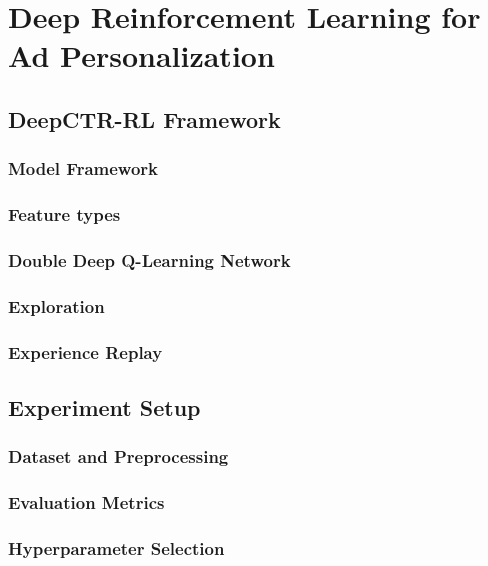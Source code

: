 \documentclass{mldsmsc}
\begin{document}
\chapter{Deep Reinforcement Learning for Ad Personalization}
\label{chap:deep-rl-for-ad-personalization}

\section{DeepCTR-RL Framework}

\subsection{Model Framework}

\subsection{Feature types}

\subsection{Double Deep Q-Learning Network}

\subsection{Exploration}

\subsection{Experience Replay}

\section{Experiment Setup}

\subsection{Dataset and Preprocessing}

\subsection{Evaluation Metrics}

\subsection{Hyperparameter Selection}
\end{document}
